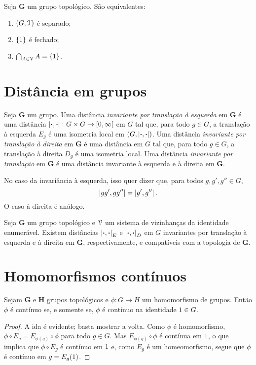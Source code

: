 \begin{proposition}
Seja $\bm G$ um grupo topológico. São equivalentes:
	\begin{enumerate}
	\item $(G,\mathcal{T})$ é separado;
	\item $\{1\}$ é fechado;
	\item $\bigcap_{A \in \mathcal{V}} A = \{1\}$.
	\end{enumerate}
\end{proposition}

\section{Distância em grupos}

\begin{definition}
Seja $\bm G$ um grupo. Uma distância \emph{invariante por translação à esquerda} em $\bm G$ é uma distância $\left\vert{\bm{\cdot}},{\bm{\cdot}}\right\vert\colon G \times G \to \left[{0},{\infty}\right[$ em $G$ tal que, para todo $g \in G$, a translação à esquerda $E_g$ é uma isometria local em $(G,\left\vert{\bm{\cdot}},{\bm{\cdot}}\right\vert)$. Uma distância \emph{invariante por translação à direita} em $\bm G$ é uma distância em $G$ tal que, para todo $g \in G$, a translação à direita $D_g$ é uma isometria local. Uma distância \emph{invariante por translação} em $\bm G$ é uma distância invariante à esquerda e à direita em $\bm G$.
\end{definition}

No caso da invariância à esquerda, isso quer dizer que, para todos $g,g',g'' \in G$,
	\begin{equation*}
	\left\vert{gg'},{gg''}\right\vert = \left\vert{g'},{g''}\right\vert.
	\end{equation*}
O caso à direita é análogo.

\begin{proposition}
Seja $\bm G$ um grupo topológico e $\mathcal{V}$ um sistema de vizinhanças da identidade enumerável. Existem distâncias $\left\vert{\bm{\cdot}},{\bm{\cdot}}\right\vert_E$ e $\left\vert{\bm{\cdot}},{\bm{\cdot}}\right\vert_D$ em $G$ invariantes por translação à esquerda e à direita em $\bm G$, respectivamente, e compatíveis com a topologia de $\bm G$.
\end{proposition}


\section{Homomorfismos contínuos}

\begin{proposition}
Sejam $\bm G$ e $\bm H$ grupos topológicos e $\phi\colon G \to H$ um homomorfismo de grupos. Então $\phi$ é contínuo se, e somente se, $\phi$ é contínuo na identidade $1 \in G$.
\end{proposition}
\begin{proof}
A ida é evidente; basta mostrar a volta. Como $\phi$ é homomorfismo, $\phi \circ E_g = E_{\phi(g)} \circ \phi$ para todo $g \in G$. Mas $E_{\phi(g)} \circ \phi$ é contínua em $1$, o que implica que $\phi \circ E_g$ é contínuo em $1$ e, como $E_g$ é um homeomorfismo, segue que $\phi$ é contínuo em $g=E_g(1)$.
\end{proof}


